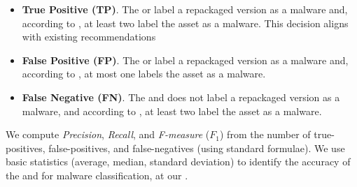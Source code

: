\begin{itemize}
\item {\bf True Positive (TP)}. The \mas or \ml label a repackaged version as a malware and, according to
  \vt, at least two \ses label the asset as a malware. This decision aligns with existing recommendations~\cite{vt-label,DBLP:journals/ese/KhanmohammadiEH19}
   
\item {\bf False Positive (FP)}. The \mas or \ml label a repackaged version as a malware and, according to \vt, at most one \se labels the asset as a malware.

\item {\bf False Negative (FN)}. The \mas and \ml does not label a repackaged version as a malware, and according to \vt, at least two \ses label the asset as a malware.
\end{itemize}

We compute \emph{Precision}, \emph{Recall}, and \emph{F-measure} ($F_1$) from
the number of true-positives, false-positives, and false-negatives (using standard
formulae). We use basic statistics (average, median, standard deviation) to identify the
accuracy of the \mas and \ml for malware classification, at our \cds.



